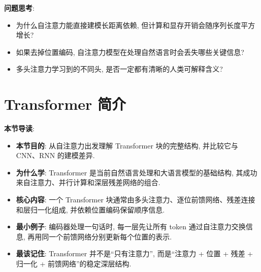 \documentclass{../nndlcourse}
\begin{document}
\textbf{问题思考}:
\begin{itemize}
  \item 为什么自注意力能直接建模长距离依赖, 但计算和显存开销会随序列长度平方增长?
  \item 如果去掉位置编码, 自注意力模型在处理自然语言时会丢失哪些关键信息?
  \item 多头注意力学习到的不同头, 是否一定都有清晰的人类可解释含义?
\end{itemize}

\section{Transformer 简介}

\textbf{本节导读}:
\begin{itemize}
  \item \textbf{本节目的}: 从自注意力出发理解 Transformer 块的完整结构, 并比较它与 CNN、RNN 的建模差异.
  \item \textbf{为什么学}: Transformer 是当前自然语言处理和大语言模型的基础结构, 其成功来自注意力、并行计算和深层残差网络的组合.
  \item \textbf{核心内容}: 一个 Transformer 块通常由多头注意力、逐位前馈网络、残差连接和层归一化组成, 并依赖位置编码保留顺序信息.
  \item \textbf{最小例子}: 编码器处理一句话时, 每一层先让所有 token 通过自注意力交换信息, 再用同一个前馈网络分别更新每个位置的表示.
  \item \textbf{最该记住}: Transformer 并不是“只有注意力”, 而是“注意力 + 位置 + 残差 + 归一化 + 前馈网络”的稳定深层结构.
\end{itemize}
\end{document}
